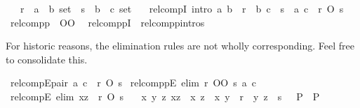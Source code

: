 \begin{isabellebody}
\ \ \ r\ {\isacharcolon}{\kern0pt}{\isacharcolon}{\kern0pt}\ {\isachardoublequoteopen}{\isacharparenleft}{\kern0pt}{\isacharprime}{\kern0pt}a\ {\isasymtimes}\ {\isacharprime}{\kern0pt}b{\isacharparenright}{\kern0pt}\ set{\isachardoublequoteclose}\ \ s\ {\isacharcolon}{\kern0pt}{\isacharcolon}{\kern0pt}\ {\isachardoublequoteopen}{\isacharparenleft}{\kern0pt}{\isacharprime}{\kern0pt}b\ {\isasymtimes}\ {\isacharprime}{\kern0pt}c{\isacharparenright}{\kern0pt}\ set{\isachardoublequoteclose}\isanewline
\ \ \ relcompI\ {\isacharbrackleft}{\kern0pt}intro{\isacharbrackright}{\kern0pt}{\isacharcolon}{\kern0pt}\ {\isachardoublequoteopen}{\isacharparenleft}{\kern0pt}a{\isacharcomma}{\kern0pt}\ b{\isacharparenright}{\kern0pt}\ {\isasymin}\ r\ {\isasymLongrightarrow}\ {\isacharparenleft}{\kern0pt}b{\isacharcomma}{\kern0pt}\ c{\isacharparenright}{\kern0pt}\ {\isasymin}\ s\ {\isasymLongrightarrow}\ {\isacharparenleft}{\kern0pt}a{\isacharcomma}{\kern0pt}\ c{\isacharparenright}{\kern0pt}\ {\isasymin}\ r\ O\ s{\isachardoublequoteclose}\isanewline
\isanewline
{}\isamarkupfalse%
\ relcompp\ {\isacharparenleft}{\kern0pt}\ {\isachardoublequoteopen}OO{\isachardoublequoteclose}\ {}{}{\isacharparenright}{\kern0pt}\isanewline
\isanewline
{}\isamarkupfalse%
\ relcomppI\ {\isacharequal}{\kern0pt}\ relcompp{\isachardot}{\kern0pt}intros%
\begin{isamarkuptext}%
For historic reasons, the elimination rules are not wholly corresponding.
  Feel free to consolidate this.%
\end{isamarkuptext}\isamarkuptrue%
\isamarkupfalse%
\ relcompEpair{\isacharcolon}{\kern0pt}\ {\isachardoublequoteopen}{\isacharparenleft}{\kern0pt}a{\isacharcomma}{\kern0pt}\ c{\isacharparenright}{\kern0pt}\ {\isasymin}\ r\ O\ s{\isachardoublequoteclose}\isanewline
{}\isamarkupfalse%
\ relcomppE\ {\isacharbrackleft}{\kern0pt}elim{\isacharbang}{\kern0pt}{\isacharbrackright}{\kern0pt}{\isacharcolon}{\kern0pt}\ {\isachardoublequoteopen}{\isacharparenleft}{\kern0pt}r\ OO\ s{\isacharparenright}{\kern0pt}\ a\ c{\isachardoublequoteclose}\isanewline
\isanewline
{}\isamarkupfalse%
\ relcompE\ {\isacharbrackleft}{\kern0pt}elim{\isacharbang}{\kern0pt}{\isacharbrackright}{\kern0pt}{\isacharcolon}{\kern0pt}\ {\isachardoublequoteopen}xz\ {\isasymin}\ r\ O\ s\ {\isasymLongrightarrow}\isanewline
\ \ {\isacharparenleft}{\kern0pt}{\isasymAnd}x\ y\ z{\isachardot}{\kern0pt}\ xz\ {\isacharequal}{\kern0pt}\ {\isacharparenleft}{\kern0pt}x{\isacharcomma}{\kern0pt}\ z{\isacharparenright}{\kern0pt}\ {\isasymLongrightarrow}\ {\isacharparenleft}{\kern0pt}x{\isacharcomma}{\kern0pt}\ y{\isacharparenright}{\kern0pt}\ {\isasymin}\ r\ {\isasymLongrightarrow}\ {\isacharparenleft}{\kern0pt}y{\isacharcomma}{\kern0pt}\ z{\isacharparenright}{\kern0pt}\ {\isasymin}\ s\ \ {\isasymLongrightarrow}\ P{\isacharparenright}{\kern0pt}\ {\isasymLongrightarrow}\ P{\isachardoublequoteclose}\isanewline

\end{isabellebody}
